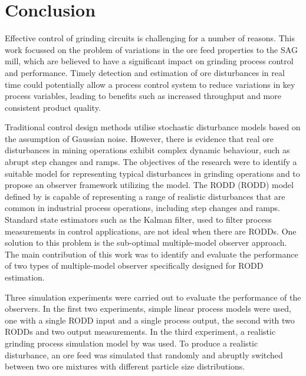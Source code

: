 \chapter*{Conclusion}           %
\label{chap-conclusion}         %

Effective control of grinding circuits is challenging for a number of reasons. This work focussed on the problem of variations in the ore feed properties to the \gls{SAG} mill, which are believed to have a significant impact on grinding process control and performance. Timely detection and estimation of ore disturbances in real time could potentially allow a process control system to reduce variations in key process variables, leading to benefits such as increased throughput and more consistent product quality.

Traditional control design methods utilise stochastic disturbance models based on the assumption of Gaussian noise. However, there is evidence that real ore disturbances in mining operations exhibit complex dynamic behaviour, such as abrupt step changes and ramps. The objectives of the research were to identify a suitable model for representing typical disturbances in grinding operations and to propose an observer framework utilizing the model. The \acrlong{RODD} (\acrshort{RODD}) model defined by \cite{macgregor_duality_1984} is capable of representing a range of realistic disturbances that are common in industrial process operations, including step changes and ramps. Standard state estimators such as the Kalman filter, used to filter process measurements in control applications, are not ideal when there are \gls{RODD}s. One solution to this problem is the sub-optimal multiple-model observer approach. The main contribution of this work was to identify and evaluate the performance of two types of multiple-model observer specifically designed for \gls{RODD} estimation.

Three simulation experiments were carried out to evaluate the performance of the observers. In the first two experiments, simple linear process models were used, one with a single \gls{RODD} input and a single process output, the second with two \gls{RODD}s and two output measurements. In the third experiment, a realistic grinding process simulation model by \cite{perez_garcia_dynamic_2020} was used. To produce a realistic disturbance, an ore feed was simulated that randomly and abruptly switched between two ore mixtures with different particle size distributions.

